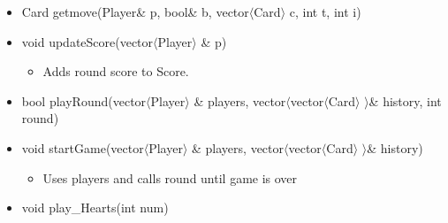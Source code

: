 \documentclass[]{scrartcl}
\begin{document}
\begin{itemize}
		\item Card getmove(Player\& p, bool\& b, vector$\langle$Card$\rangle$  c, int t, int i)
		\item void updateScore(vector$\langle$Player$\rangle$ \& p)
			\begin{itemize}
				\item Adds round score to Score.
			\end{itemize}
		\item bool playRound(vector$\langle$Player$\rangle$ \& players, vector$\langle$vector$\langle$Card$\rangle$ $\rangle$\& history, int round)
		\item void startGame(vector$\langle$Player$\rangle$ \& players, vector$\langle$vector$\langle$Card$\rangle$ $\rangle$\& history) 
			\begin{itemize}
				\item  Uses players and calls round until game is over
			\end{itemize}
		\item void play\_Hearts(int num)

	\end{itemize}
\end{document}
